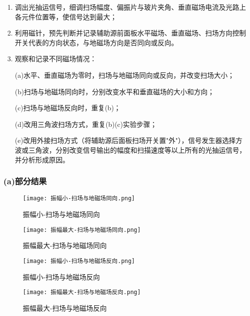 \begin{enumerate}
    \item 调出光抽运信号，细调扫场幅度、偏振片与玻片夹角、垂直磁场电流及光路上各元件位置等，使信号达到最大；
    
    \item 利用磁针，预先判断并记录辅助源前面板水平磁场、垂直磁场、扫场方向控制开关代表的方向状态，与地磁场方向是否同向或反向。
    
    \item 观察和记录不同磁场情况：

        (a)水平、垂直磁场为零时，扫场与地磁场同向或反向，并改变扫场大小；
        
       (b)扫场与地磁场同向时，分别改变水平和垂直磁场的大小和方向；
        
        (c)扫场与地磁场反向时，重复(b)；
        
        (d)改用三角波扫场方式，重复(b)(c)实验步骤；
        
       (e)改用外接扫场方式（将辅助源后面板扫场开关置"外"），信号发生器选择方波或三角波，分别改变信号输出的幅度和扫描速度等以上所有的光抽运信号，并分析形成原因。
    \end{enumerate}

\subsubsection{(a)部分结果}

 \begin{figure}[H]
    \centering
    \begin{minipage}[b]{0.45\linewidth}
        \centering
        \texttt{[image: 振幅小-扫场与地磁场同向.png]}
        \caption{振幅小-扫场与地磁场同向}
        \label{fig:same_small}
    \end{minipage}
    \hfill
    \begin{minipage}[b]{0.45\linewidth}
        \centering
        \texttt{[image: 振幅最大-扫场与地磁场同向.png]}
        \caption{振幅最大-扫场与地磁场同向}
        \label{fig:same_large}
    \end{minipage}

    \label{fig:same_direction}
\end{figure}

\begin{figure}[H]
    \centering
    \begin{minipage}[b]{0.45\linewidth}
        \centering
        \texttt{[image: 振幅小-扫场与地磁场反向.png]}
        \caption{振幅小-扫场与地磁场反向}
        \label{fig:opposite_small}
    \end{minipage}
    \hfill
    \begin{minipage}[b]{0.45\linewidth}
        \centering
        \texttt{[image: 振幅最大-扫场与地磁场反向.png]}
        \caption{振幅最大-扫场与地磁场反向}
        \label{fig:opposite_large}
    \end{minipage}

    \label{fig:opposite_direction}
\end{figure}


